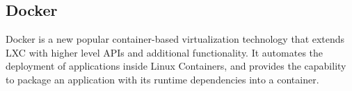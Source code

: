 


\subsection{Docker}

Docker is a new popular container-based virtualization technology that extends LXC
with higher level APIs and additional functionality. It automates the deployment of
applications inside Linux Containers, and provides the capability to package an
application with its runtime dependencies into a container.


